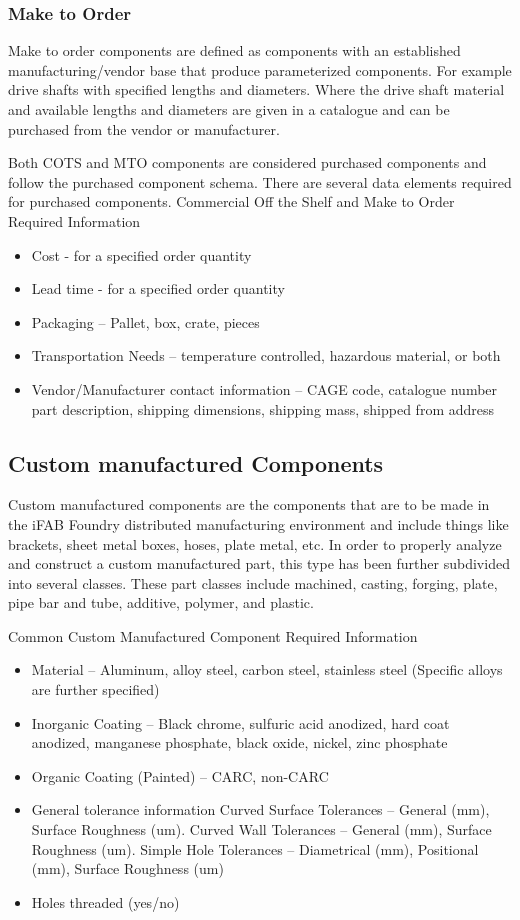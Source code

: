 \subsubsection{Make to Order}
Make to order components are defined as components with an established manufacturing/vendor base that produce parameterized components.  For example drive shafts with specified lengths and diameters.  Where the drive shaft material and available lengths and diameters are given in a catalogue and can be purchased from the vendor or manufacturer.

Both COTS and MTO components are considered purchased components and follow the purchased component schema.  There are several data elements required for purchased components.
Commercial Off the Shelf  and Make to Order Required Information
\begin{itemize}
\item Cost - for a specified order quantity
\item Lead time - for a specified order quantity
\item Packaging – Pallet, box, crate, pieces
\item Transportation Needs – temperature controlled, hazardous material, or both
\item Vendor/Manufacturer contact information – CAGE code, catalogue number part description, shipping dimensions, shipping mass, shipped from address
\end{itemize}

\subsection{Custom manufactured Components}
Custom manufactured components are the components that are to be made in the iFAB Foundry distributed manufacturing environment and include things like brackets, sheet metal boxes, hoses, plate metal, etc.  In order to properly analyze and construct a custom manufactured part, this type has been further subdivided into several classes.  These part classes include machined, casting, forging, plate, pipe bar and tube, additive, polymer, and plastic.

Common Custom Manufactured Component Required Information
\begin{itemize}
\item Material – Aluminum, alloy steel, carbon steel, stainless steel (Specific alloys are further specified)
\item Inorganic Coating – Black chrome, sulfuric acid anodized, hard coat anodized, manganese phosphate, black oxide, nickel, 		zinc phosphate
\item Organic Coating (Painted) – CARC, non-CARC
\item General tolerance information
\subitem Curved Surface Tolerances – General (mm), Surface Roughness (um).
\subitem Curved Wall Tolerances – General (mm), Surface Roughness (um).
\subitem Simple Hole Tolerances – Diametrical (mm), Positional (mm), Surface Roughness (um)
\item Holes threaded (yes/no)
\end{itemize}

